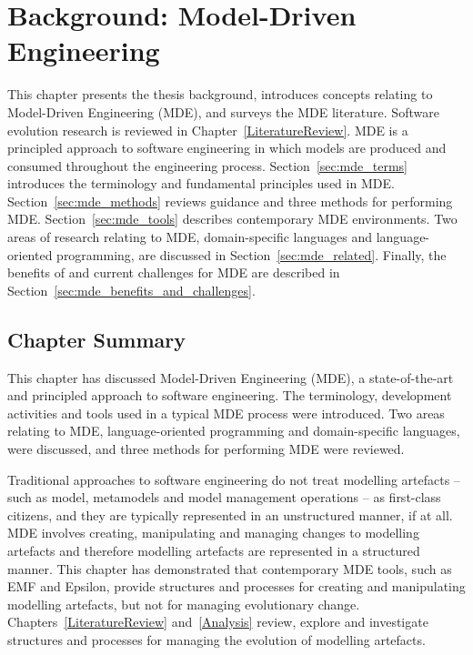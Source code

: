 
\chapter{Background: Model-Driven Engineering}
\label{Background}
This chapter presents the thesis background, introduces concepts relating to Model-Driven Engineering (MDE), and surveys the MDE literature. Software evolution research is reviewed in Chapter~\ref{LiteratureReview}. MDE is a principled approach to software engineering in which models are produced and consumed throughout the engineering process. Section~\ref{sec:mde_terms} introduces the terminology and fundamental principles used in MDE. Section~\ref{sec:mde_methods} reviews guidance and three methods for performing MDE. Section~\ref{sec:mde_tools} describes contemporary MDE environments. Two areas of research relating to MDE, domain-specific languages and language-oriented programming, are discussed in Section~\ref{sec:mde_related}. Finally, the benefits of and current challenges for MDE are described in Section~\ref{sec:mde_benefits_and_challenges}.







\section{Chapter Summary}
This chapter has discussed Model-Driven Engineering (MDE), a state-of-the-art and principled approach to software engineering. The terminology, development activities and tools used in a typical MDE process were introduced. Two areas relating to MDE, language-oriented programming and domain-specific languages, were discussed, and three methods for performing MDE were reviewed.

Traditional approaches to software engineering do not treat modelling artefacts -- such as model, metamodels and model management operations -- as first-class citizens, and they are typically represented in an unstructured manner, if at all. MDE involves creating, manipulating and managing changes to modelling artefacts and therefore modelling artefacts are represented in a structured manner. This chapter has demonstrated that contemporary MDE tools, such as EMF and Epsilon, provide structures and processes for creating and manipulating modelling artefacts, but not for managing evolutionary change. Chapters~\ref{LiteratureReview} and~\ref{Analysis} review, explore and investigate structures and processes for managing the evolution of modelling artefacts.